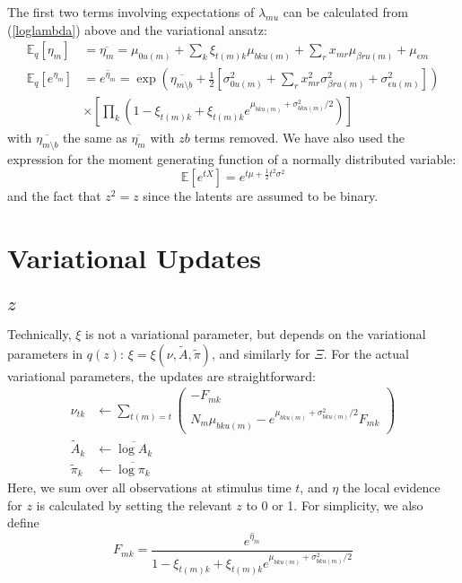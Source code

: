 \documentclass[11pt]{article}
\begin{document}
The first two terms involving expectations of $\lambda_{mu}$ can be calculated from (\ref{loglambda}) above and the variational ansatz:
\begin{align}
    \mathbb{E}_q [\eta_m] &= \overline{\eta_m} =
    \mu_{0u(m)} + \sum_{k} \xi_{t(m) k} \mu_{bku(m)} + \sum_r x_{mr} \mu_{\beta r u(m)} + \mu_{\epsilon m} \\
    \mathbb{E}_q [e^{\eta_m}] &= \overline{e^{\eta_m}} = \exp \left(
    \overline{\eta_{m \setminus b}}
    + \frac{1}{2} \left[ \sigma^2_{0u(m)}
    + \sum_r x^2_{m r} \sigma^2_{\beta ru(m)} + \sigma^2_{\epsilon u(m)}
    \right]
    \right) \\ \nonumber
    &\times \left[
    \prod_k \left(
    1 - \xi_{t(m) k} + \xi_{t(m) k} e^{\mu_{bku(m)} + \sigma^2_{bku(m)} / 2}
    \right)\right]
\end{align}
with $\overline{\eta_{m \setminus b}}$ the same as $\overline{\eta_m}$ with $zb$ terms removed. We have also used the expression for the moment generating function of a normally distributed variable:
\begin{equation}
    \mathbb{E}[e^{tX}] = e^{t\mu + \frac{1}{2} t^2\sigma^2}
\end{equation}
and the fact that $z^2 = z$ since the latents are assumed to be binary.


\section{Variational Updates}

\subsection{$z$}
Technically, $\xi$ is not a variational parameter, but depends on the variational parameters in $q(z)$: $\xi = \xi(\nu, \tilde{A}, \tilde{\pi})$, and similarly for $\Xi$. For the actual variational parameters, the updates are straightforward:
\begin{align}
    \nu_{tk} &\leftarrow \sum_{t(m) = t}
    \begin{pmatrix}
        - F_{mk} \\
        N_{m} \mu_{bku(m)} -
        e^{\mu_{bku(m)} + \sigma^2_{bku(m)} / 2} F_{mk}
    \end{pmatrix} \\
    \tilde{A}_{k} &\leftarrow \overline{\log A_k} \\
    \tilde{\pi}_k &\leftarrow \overline{\log \pi_k}
\end{align}
Here, we sum over all observations at stimulus time $t$, and $\eta$ the local evidence for $z$ is calculated by setting the relevant $z$ to 0 or 1. For simplicity, we also define
\begin{equation}
    F_{mk} = \frac{\overline{e^{\eta_m}}}{1 - \xi_{t(m) k} + \xi_{t(m) k} e^{\mu_{bku(m)} + \sigma^2_{bku(m)} / 2}}
\end{equation}
\end{document}
